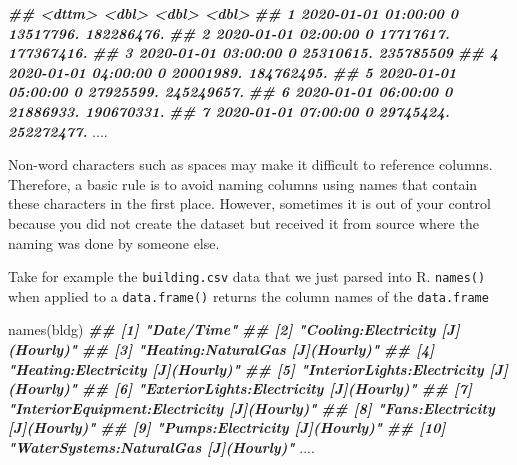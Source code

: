 \documentclass[
]{book}
\newenvironment{Shaded}{\begin{snugshade}}{\end{snugshade}}
\newcommand{\DocumentationTok}[1]{\textcolor[rgb]{0.56,0.35,0.01}{\textbf{\textit{#1}}}}
\newcommand{\FunctionTok}[1]{\textcolor[rgb]{0.00,0.00,0.00}{#1}}
\newcommand{\NormalTok}[1]{#1}
\begin{document}
\begin{Shaded}
\begin{Highlighting}[]
\DocumentationTok{\#\#    \textless{}dttm\textgreater{}                            \textless{}dbl\textgreater{}              \textless{}dbl\textgreater{}              \textless{}dbl\textgreater{}}
\DocumentationTok{\#\#  1 2020{-}01{-}01 01:00:00                   0          13517796.         182286476.}
\DocumentationTok{\#\#  2 2020{-}01{-}01 02:00:00                   0          17717617.         177367416.}
\DocumentationTok{\#\#  3 2020{-}01{-}01 03:00:00                   0          25310615.         235785509 }
\DocumentationTok{\#\#  4 2020{-}01{-}01 04:00:00                   0          20001989.         184762495.}
\DocumentationTok{\#\#  5 2020{-}01{-}01 05:00:00                   0          27925599.         245249657.}
\DocumentationTok{\#\#  6 2020{-}01{-}01 06:00:00                   0          21886933.         190670331.}
\DocumentationTok{\#\#  7 2020{-}01{-}01 07:00:00                   0          29745424.         252272477.}
\NormalTok{....}
\end{Highlighting}
\end{Shaded}

Non-word characters such as spaces may make it difficult to reference columns. Therefore, a basic rule is to avoid naming columns using names that contain these characters in the first place. However, sometimes it is out of your control because you did not create the dataset but received it from source where the naming was done by someone else.

Take for example the \texttt{building.csv} data that we just parsed into R. \texttt{names()} when applied to a \texttt{data.frame()} returns the column names of the \texttt{data.frame}

\begin{Shaded}
\begin{Highlighting}[]
\FunctionTok{names}\NormalTok{(bldg)}
\DocumentationTok{\#\#  [1] "Date/Time"                                }
\DocumentationTok{\#\#  [2] "Cooling:Electricity [J](Hourly)"          }
\DocumentationTok{\#\#  [3] "Heating:NaturalGas [J](Hourly)"           }
\DocumentationTok{\#\#  [4] "Heating:Electricity [J](Hourly)"          }
\DocumentationTok{\#\#  [5] "InteriorLights:Electricity [J](Hourly)"   }
\DocumentationTok{\#\#  [6] "ExteriorLights:Electricity [J](Hourly)"   }
\DocumentationTok{\#\#  [7] "InteriorEquipment:Electricity [J](Hourly)"}
\DocumentationTok{\#\#  [8] "Fans:Electricity [J](Hourly)"             }
\DocumentationTok{\#\#  [9] "Pumps:Electricity [J](Hourly)"            }
\DocumentationTok{\#\# [10] "WaterSystems:NaturalGas [J](Hourly)"}
\NormalTok{....}
\end{Highlighting}
\end{Shaded}
\end{document}
